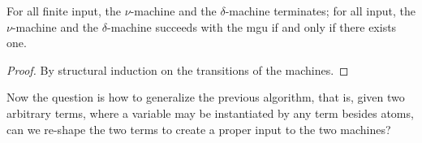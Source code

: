 \documentclass[a4paper,UKenglish]{lipics-v2016}
\begin{document}
\begin{lemma}\label{lemma:numachine}
 For all finite input, the $\nu$-machine and the $\delta$-machine
 terminates; for all input, the $\nu$-machine and the $\delta$-machine
 succeeds with the mgu if and only if there exists one.
\end{lemma}
\begin{proof}
    By structural induction on the transitions of the machines.
\end{proof}


Now the question is how to generalize the previous algorithm, that is,
given two arbitrary terms, where a variable may be instantiated by any
term besides atoms, can we re-shape the two terms to create a proper
input to the two machines?


\end{document}
